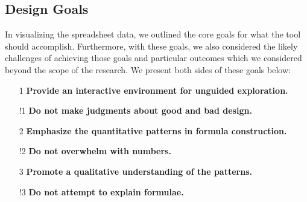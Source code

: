 \documentclass[conference]{IEEEtran}
\begin{document}
	\subsection{Design Goals} In visualizing the spreadsheet data, we outlined the
	core goals for what the tool should accomplish. Furthermore, with these goals,
	we also considered the likely challenges of achieving those goals and 
	particular outcomes which we considered beyond the scope of the research. We present
	both sides of these goals below:
	
	\begin{itemize}
		
		\item [1] \textbf{Provide an interactive environment for unguided exploration.} 
		
		
		\item [!1] \textbf{Do not make judgments about good and bad design.} 
	
		
		\item [2] \textbf{Emphasize the quantitative patterns in formula construction.}
		
		
		\item [!2] \textbf{Do not overwhelm with numbers.} 
		
		
		\item [3] \textbf{Promote a qualitative understanding of the patterns.} 
		
		
		\item [!3] \textbf{Do not attempt to explain formulae.} 
		
		
	\end{itemize}
	
\end{document}
